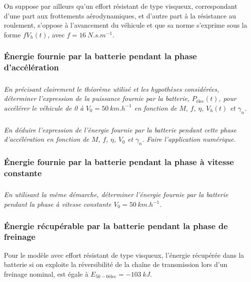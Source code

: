 \documentclass[10pt,fleqn]{article} %
\begin{document}
\begin{multicols}{2}
On suppose par ailleurs qu’un effort résistant de type visqueux, correspondant d’une part aux frottements
aérodynamiques, et d’autre part à la résistance au roulement, s’oppose à l’avancement du véhicule et que sa
norme s’exprime sous la forme $fV_h(t)$, avec $f = \SI{16}{N.s.m^{-1}}$.

\subsubsection*{Énergie fournie par la batterie pendant la phase d’accélération}


\subparagraph{}\textit{En précisant clairement le théorème utilisé et les hypothèses considérées, déterminer l’expression de la puissance fournie par la batterie, $P_{\text{élec}}(t)$, pour accélérer le véhicule de 0 à $V_0 = \SI{50}{km.h^{-1}}$ en fonction de $M$, $f$, $\eta$, $V_h(t)$ et $\gamma_n$.}
\ifprof
\begin{corrige}
\end{corrige}
\else
\fi


\subparagraph{}\textit{En déduire l’expression de l’énergie fournie par la batterie pendant cette phase d’accélération en fonction de $M$, $f$, $\eta$, $V_0$ et $\gamma_n$. Faire l’application numérique.}
\ifprof
\begin{corrige}
\end{corrige}
\else
\fi

\subsubsection*{Énergie fournie par la batterie pendant la phase à vitesse constante}


\subparagraph{}\textit{En utilisant la même démarche, déterminer l’énergie fournie par la batterie pendant la phase à vitesse constante $V_0 = \SI{50}{km.h^{-1}}$.}
\ifprof
\begin{corrige}
\end{corrige}
\else
\fi



\subsubsection*{Énergie récupérable par la batterie pendant la phase de freinage}

Pour le modèle avec effort résistant de type visqueux, l’énergie récupérée dans la batterie si on exploite la
réversibilité de la chaîne de transmission lors d’un freinage nominal, est égale à $E_{50-0\text{élec}} = -\SI{103}{kJ}$.


\end{multicols}
\end{document}
